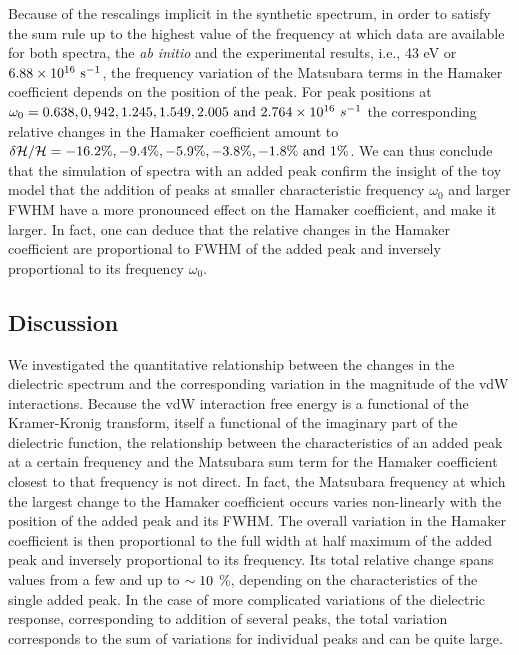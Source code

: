 \documentclass[letterpaper,twocolumn,amsmath,amssymb,floatfix,aps,superscriptaddress]{revtex4}
\begin{document}
Because of the rescalings implicit in the synthetic spectrum, in order to satisfy the sum rule up to the highest value of the frequency at which data are available for both spectra, the {\sl ab initio} and the experimental results, i.e., 43 eV or $\rm 6.88 \times 10^{16}~s^{-1}$, the frequency variation of the Matsubara terms in the Hamaker coefficient depends on the position of the peak. For peak positions at $\omega_0 = 0.638,  0,942,  1.245, 1.549, 2.005 ~{\rm and} ~2.764 \times 10^{16} ~s^{-1}$ the corresponding relative changes in the Hamaker coefficient amount to $\delta {\cal H}/{\cal H} = \rm -16.2 \%, -9.4 \%, -5.9 \%, -3.8 \%, -1.8 \% ~{\rm and} ~ 1 \%$. We can thus conclude that the simulation of spectra with an added peak confirm the insight of the toy model that the addition of peaks at smaller characteristic frequency $\omega_0$ and larger FWHM have a more pronounced effect on the Hamaker coefficient, and make it larger. In fact, one can deduce that the relative changes in the Hamaker coefficient are proportional to FWHM of the added peak and inversely proportional to its frequency $\omega_0$. 

\subsection{Discussion}

We investigated the quantitative relationship between the changes in the dielectric spectrum and the corresponding variation in the magnitude of the vdW interactions. Because the vdW interaction free energy is a functional of the Kramer-Kronig transform, itself a functional of the imaginary part of the dielectric function, the relationship between the characteristics of an added peak at a certain frequency and the Matsubara sum term for the Hamaker coefficient closest to that frequency is not direct. In fact, the Matsubara frequency at which the largest change to the Hamaker coefficient occurs varies non-linearly with the position of the added peak and its FWHM. The overall variation in the Hamaker coefficient is then proportional to the full width at half maximum of the added peak and inversely proportional to its frequency. Its total relative change spans values from a few and up to $\rm \sim 10$ \%, depending on the characteristics of the single added peak. In the case of more complicated variations of the dielectric response, corresponding to addition of several peaks, the total variation corresponds to the sum of variations for individual peaks and can be quite large.  
\end{document}
